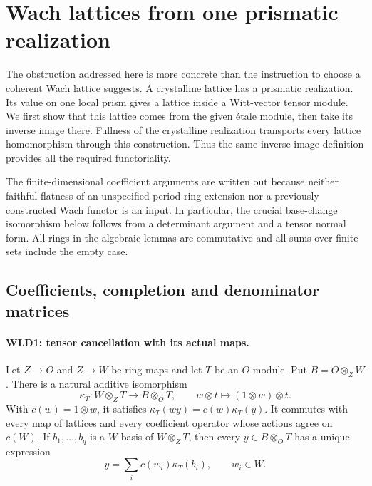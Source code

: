 \section{Wach lattices from one prismatic realization}
\label{sec:wach-lattice-descent-v053}


The obstruction addressed here is more concrete than the instruction to
choose a coherent Wach lattice suggests. A crystalline lattice has
a prismatic realization. Its value on one local prism gives a lattice
inside a Witt-vector tensor module. We first show that this lattice
comes from the given \'etale module, then take its inverse image there.
Fullness of the crystalline realization transports every lattice
homomorphism through this construction. Thus the same inverse-image
definition provides all the required functoriality.

The finite-dimensional coefficient arguments are written out because
neither faithful flatness of an unspecified period-ring extension nor
a previously constructed Wach functor is an input. In particular,
the crucial base-change isomorphism below follows from a determinant
argument and a tensor normal form. All rings in the algebraic lemmas
are commutative and all sums over finite sets include the empty case.

\subsection{Coefficients, completion and denominator matrices}

\paragraph{WLD1: tensor cancellation with its actual maps.}
\label{claim:WLD1}
Let $Z\to O$ and $Z\to W$ be ring maps and let $T$ be an $O$-module.
Put $B=O\otimes_ZW$. There is a natural additive isomorphism
\[
 \kappa_T:W\otimes_ZT\longrightarrow B\otimes_OT,\qquad
 w\otimes t\longmapsto(1\otimes w)\otimes t.                 \tag{WLD.1}
\]
With $c(w)=1\otimes w$, it satisfies
$\kappa_T(wy)=c(w)\kappa_T(y)$. It commutes with every map of
lattices and every coefficient operator whose actions agree on
$c(W)$. If $b_1,\ldots,b_q$ is a $W$-basis of $W\otimes_ZT$,
then every $y\in B\otimes_OT$ has a unique expression
\[
                 y=\sum_i c(w_i)\kappa_T(b_i),\qquad w_i\in W.
                                                               \tag{WLD.2}
\]

